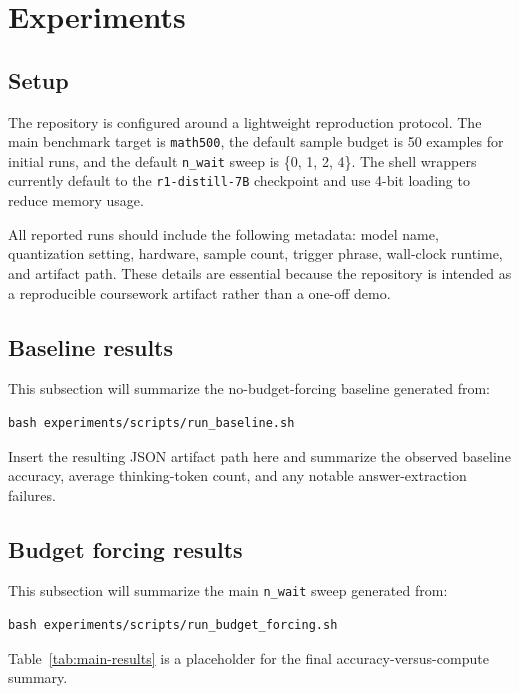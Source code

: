 \section{Experiments}\label{sec:experiments}

\subsection{Setup}

The repository is configured around a lightweight reproduction protocol. The main benchmark target is \texttt{math500}, the default sample budget is 50 examples for initial runs, and the default \texttt{n\_wait} sweep is \{0, 1, 2, 4\}. The shell wrappers currently default to the \texttt{r1-distill-7B} checkpoint and use 4-bit loading to reduce memory usage.

All reported runs should include the following metadata: model name, quantization setting, hardware, sample count, trigger phrase, wall-clock runtime, and artifact path. These details are essential because the repository is intended as a reproducible coursework artifact rather than a one-off demo.

\subsection{Baseline results}

This subsection will summarize the no-budget-forcing baseline generated from:

\begin{verbatim}
bash experiments/scripts/run_baseline.sh
\end{verbatim}

Insert the resulting JSON artifact path here and summarize the observed baseline accuracy, average thinking-token count, and any notable answer-extraction failures.

\subsection{Budget forcing results}

This subsection will summarize the main \texttt{n\_wait} sweep generated from:

\begin{verbatim}
bash experiments/scripts/run_budget_forcing.sh
\end{verbatim}

Table~\ref{tab:main-results} is a placeholder for the final accuracy-versus-compute summary.


